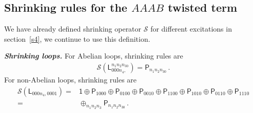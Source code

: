 \documentclass[11pt,nofootinbib,preprint]{revtex4-1}
\begin{document}
\subsection{Shrinking rules for the $AAAB$ twisted term}
We have already defined shrinking operator $\mathcal{S}$ for different excitations in section~\ref{s4}, we continue to use this definition. 

\textbf{\textit{Shrinking loops.}}
For Abelian loops, shrinking rules are
\begin{align}
	\mathcal{S} \left( \mathsf{L}_{000n_4,}^{n_1n_2n_30} \right) =\mathsf{P}_{n_1n_2n_30}\,.
\end{align}
For non-Abelian loops, shrinking rules are
\begin{align}
	\mathcal{S} \left( \mathsf{L}_{000n_4,0001} \right) =&\mathsf{1}\oplus \mathsf{P}_{1000}\oplus \mathsf{P}_{0100}\oplus \mathsf{P}_{0010}\oplus \mathsf{P}_{1100}\oplus \mathsf{P}_{1010}\oplus \mathsf{P}_{0110}\oplus \mathsf{P}_{1110}\nonumber
	\\
	=&\oplus _{n_1n_2n_3}\mathsf{P}_{n_1n_2n_30}\,.
\end{align}
\end{document}
